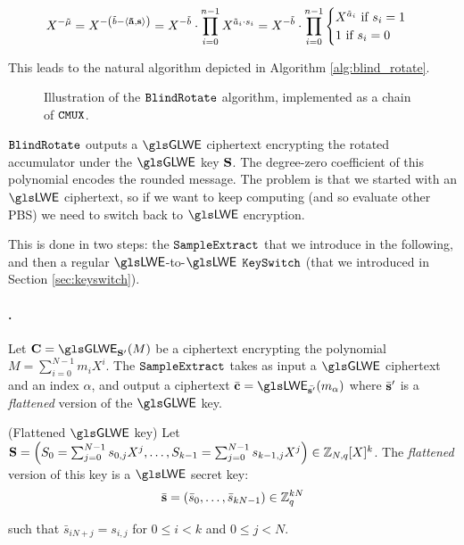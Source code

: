 \[
	X^{-\tilde \mu} = X^{- \left ( \tilde b - \left \langle \mathbf{\tilde a}, \mathbf s \right \rangle \right ) } =  X^{-\tilde b} \cdot \prod_{i=0}^{n-1} X^{\tilde a_i \cdot s_i} = X^{-\tilde b} \cdot \prod_{i=0}^{n-1} \begin{cases}
		X^{\tilde a_i} \text{ if } s_i = 1\\
		1 \text{ if } s_i = 0
	\end{cases}
\]


This leads to the natural algorithm depicted in Algorithm \ref{alg:blind_rotate}.




\begin{figure}
	\centering
	\blindRotatePicture
	\caption{Illustration of the $\texttt{BlindRotate}$ algorithm, implemented as a chain of $\texttt{CMUX}$.}
	\label{fig:cmux_chain}
\end{figure}


$\texttt{BlindRotate}$ outputs a $\GLWE$ ciphertext encrypting the rotated accumulator under the $\GLWE$ key $\mathbf S$. The degree-zero coefficient of this polynomial encodes the rounded message. The problem is that we started with an $\LWE$ ciphertext, so if we want to keep computing (and so evaluate other \gls{PBS}) we need to switch back to $\LWE$ encryption.


This is done in two steps: the $\texttt{SampleExtract}$ that we introduce in the following, and then a regular $\LWE$-to-$\LWE$ $\texttt{KeySwitch}$ (that we introduced in Section \ref{sec:keyswitch}).


\paragraph{\SampleExtract.}
Let $\vec C = \GLWE_{\glweSecretKey'}(M)$ be a ciphertext encrypting the polynomial $M = \sum_{i=0}^{N-1} m_i X^i$. The $\texttt{SampleExtract}$ takes as input a $\GLWE$ ciphertext and an index $\alpha$, and output a ciphertext $\bar{\vec c} = \LWE_{\bar{\lweSecretKey'}}(m_\alpha)$ where $\bar {\mathbf s}'$ is a \textit{flattened} version of the $\GLWE$ key. 

\begin{definition} (Flattened $\GLWE$ key)
	Let $\mathbf S = \left ( S_0 = \sum_{j=0}^{N-1} s_{0, j} X^j, \dots,  S_{k-1} = \sum_{j=0}^{N-1} s_{k-1, j} X^j\right ) \in \mathbb{Z}_{N,q}[X]^k$. The \textit{flattened} version of this key is a $\LWE$ secret key:
	\[
		\bar{\mathbf s} =  (\bar s_0, \dots, \bar s_{kN-1}) \in \mathbb{Z}_q^{kN}
	\] 
	
	 \noindent such that $\bar s_{iN + j} = s_{i, j}$ for $0 \le i < k$ and $0 \le j < N$.
\end{definition}

